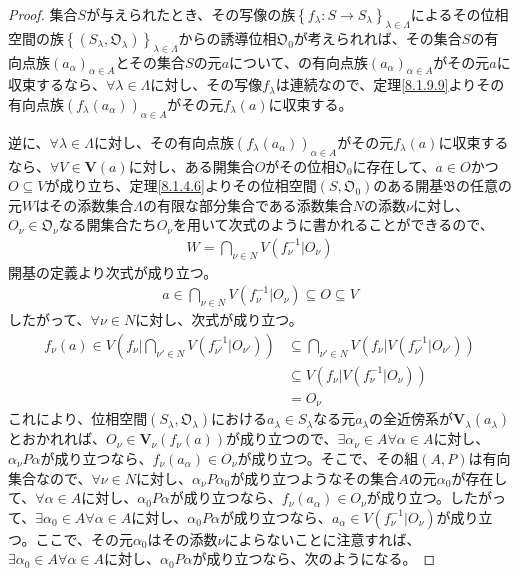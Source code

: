 \documentclass[dvipdfmx]{jsarticle}
\begin{document}
\begin{proof}
集合$S$が与えられたとき、その写像の族$\left\{ f_{\lambda}:S \rightarrow S_{\lambda} \right\}_{\lambda \in \varLambda}$によるその位相空間の族$\left\{ \left( S_{\lambda},\mathfrak{O}_{\lambda} \right) \right\}_{\lambda \in \varLambda}$からの誘導位相$\mathfrak{O}_{0}$が考えられれば、その集合$S$の有向点族$\left( a_{\alpha} \right)_{\alpha \in A}$とその集合$S$の元$a$について、の有向点族$\left( a_{\alpha} \right)_{\alpha \in A}$がその元$a$に収束するなら、$\forall\lambda \in \varLambda$に対し、その写像$f_{\lambda}$は連続なので、定理\ref{8.1.9.9}よりその有向点族$\left( f_{\lambda}\left( a_{\alpha} \right) \right)_{\alpha \in A}$がその元$f_{\lambda}(a)$に収束する。\par
逆に、$\forall\lambda \in \varLambda$に対し、その有向点族$\left( f_{\lambda}\left( a_{\alpha} \right) \right)_{\alpha \in A}$がその元$f_{\lambda}(a)$に収束するなら、$\forall V \in \mathbf{V}(a)$に対し、ある開集合$O$がその位相$\mathfrak{O}_{0}$に存在して、$a \in O$かつ$O \subseteq V$が成り立ち、定理\ref{8.1.4.6}よりその位相空間$\left( S,\mathfrak{O}_{0} \right)$のある開基$\mathfrak{B}$の任意の元$W$はその添数集合$\varLambda$の有限な部分集合である添数集合$N$の添数$\nu$に対し、$O_{\nu} \in \mathfrak{O}_{\nu}$なる開集合たち$O_{\nu}$を用いて次式のように書かれることができるので、
\begin{align*}
W = \bigcap_{\nu \in N } {V\left( f_{\nu}^{- 1}|O_{\nu} \right)}
\end{align*}
開基の定義より次式が成り立つ。
\begin{align*}
a \in \bigcap_{\nu \in N } {V\left( f_{\nu}^{- 1}|O_{\nu} \right)} \subseteq O \subseteq V
\end{align*}
したがって、$\forall\nu \in N$に対し、次式が成り立つ。
\begin{align*}
f_{\nu}(a) \in V\left( f_{\nu}|\bigcap_{\nu' \in N } {V\left( f_{\nu'}^{- 1}|O_{\nu'} \right)} \right) &\subseteq \bigcap_{\nu' \in N} {V\left( f_{\nu}|V\left( f_{\nu'}^{- 1}|O_{\nu'} \right) \right)}\\
&\subseteq V\left( f_{\nu}|V\left( f_{\nu}^{- 1}|O_{\nu} \right) \right)\\
&= O_{\nu}
\end{align*}
これにより、位相空間$\left( S_{\lambda},\mathfrak{O}_{\lambda} \right)$における$a_{\lambda} \in S_{\lambda}$なる元$a_{\lambda}$の全近傍系が$\mathbf{V}_{\lambda}\left( a_{\lambda} \right)$とおかれれば、$O_{\nu} \in \mathbf{V}_{\nu}\left( f_{\nu}(a) \right)$が成り立つので、$\exists\alpha_{\nu} \in A\forall\alpha \in A$に対し、$\alpha_{\nu}P\alpha$が成り立つなら、$f_{\nu}\left( a_{\alpha} \right) \in O_{\nu}$が成り立つ。そこで、その組$(A,P)$は有向集合なので、$\forall\nu \in N$に対し、$\alpha_{\nu}P\alpha_{0}$が成り立つようなその集合$A$の元$\alpha_{0}$が存在して、$\forall\alpha \in A$に対し、$\alpha_{0}P\alpha$が成り立つなら、$f_{\nu}\left( a_{\alpha} \right) \in O_{\nu}$が成り立つ。したがって、$\exists\alpha_{0} \in A\forall\alpha \in A$に対し、$\alpha_{0}P\alpha$が成り立つなら、$a_{\alpha} \in V\left( f_{\nu}^{- 1}|O_{\nu} \right)$が成り立つ。ここで、その元$\alpha_{0}$はその添数$\nu$によらないことに注意すれば、$\exists\alpha_{0} \in A\forall\alpha \in A$に対し、$\alpha_{0}P\alpha$が成り立つなら、次のようになる。

\end{proof}
\end{document}
